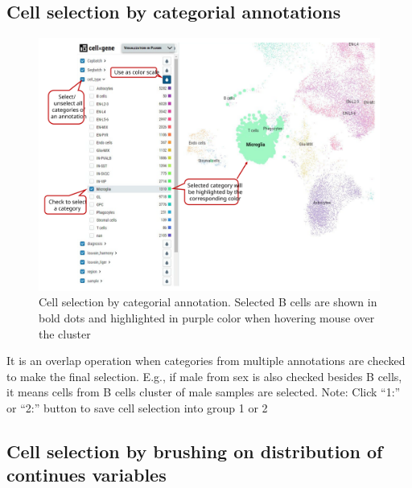 \documentclass[
]{article}
\begin{document}
\hypertarget{cell-selection-by-categorial-annotations}{%
\subsection{Cell selection by categorial annotations}\label{cell-selection-by-categorial-annotations}}

\begin{figure}
\centering
\includegraphics{figures/F2_label.svg}
\caption{Cell selection by categorial annotation. Selected B cells are shown in bold dots and highlighted in purple color when hovering mouse over the cluster}
\end{figure}

It is an overlap operation when categories from multiple annotations are checked to make the final selection. E.g., if male from sex is also checked besides B cells, it means cells from B cells cluster of male samples are selected.
Note: Click ``1:'' or ``2:'' button to save cell selection into group 1 or 2

\hypertarget{cell-selection-by-brushing-on-distribution-of-continues-variables}{%
\subsection{Cell selection by brushing on distribution of continues variables}\label{cell-selection-by-brushing-on-distribution-of-continues-variables}}
\end{document}
